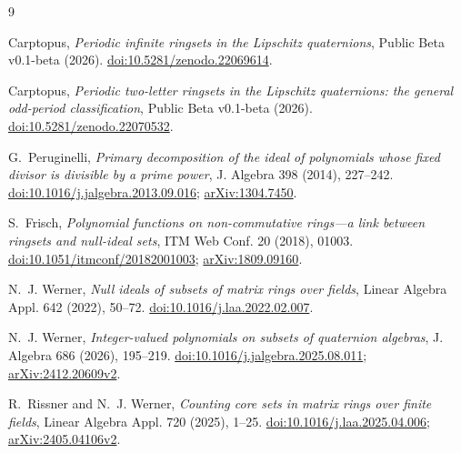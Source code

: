 \documentclass[11pt]{article}
\numberwithin{equation}{section}
\begin{document}
\begin{thebibliography}{9}
\footnotesize

Carptopus,
\emph{Periodic infinite ringsets in the Lipschitz quaternions},
Public Beta v0.1-beta (2026).
\href{https://doi.org/10.5281/zenodo.22069614}{doi:10.5281/zenodo.22069614}.

Carptopus,
\emph{Periodic two-letter ringsets in the Lipschitz quaternions: the general odd-period classification},
Public Beta v0.1-beta (2026).
\href{https://doi.org/10.5281/zenodo.22070532}{doi:10.5281/zenodo.22070532}.

G.~Peruginelli,
\emph{Primary decomposition of the ideal of polynomials whose fixed divisor is divisible by a prime power},
J. Algebra 398 (2014), 227--242.
\href{https://doi.org/10.1016/j.jalgebra.2013.09.016}{doi:10.1016/j.jalgebra.2013.09.016};
\href{https://arxiv.org/abs/1304.7450}{arXiv:1304.7450}.

S.~Frisch,
\emph{Polynomial functions on non-commutative rings---a link between ringsets and null-ideal sets},
ITM Web Conf. 20 (2018), 01003.
\href{https://doi.org/10.1051/itmconf/20182001003}{doi:10.1051/itmconf/20182001003};
\href{https://arxiv.org/abs/1809.09160}{arXiv:1809.09160}.

N.~J. Werner,
\emph{Null ideals of subsets of matrix rings over fields},
Linear Algebra Appl. 642 (2022), 50--72.
\href{https://doi.org/10.1016/j.laa.2022.02.007}{doi:10.1016/j.laa.2022.02.007}.

N.~J. Werner,
\emph{Integer-valued polynomials on subsets of quaternion algebras},
J. Algebra 686 (2026), 195--219.
\href{https://doi.org/10.1016/j.jalgebra.2025.08.011}{doi:10.1016/j.jalgebra.2025.08.011};
\href{https://arxiv.org/abs/2412.20609}{arXiv:2412.20609v2}.

R.~Rissner and N.~J. Werner,
\emph{Counting core sets in matrix rings over finite fields},
Linear Algebra Appl. 720 (2025), 1--25.
\href{https://doi.org/10.1016/j.laa.2025.04.006}{doi:10.1016/j.laa.2025.04.006};
\href{https://arxiv.org/abs/2405.04106}{arXiv:2405.04106v2}.

\end{thebibliography}
\end{document}
